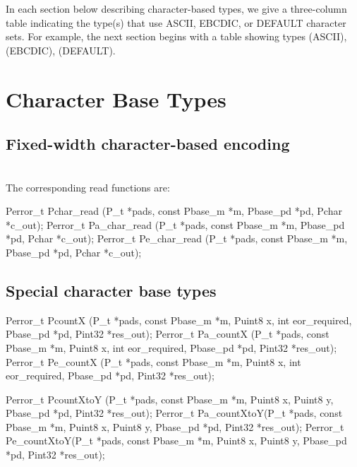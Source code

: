 In each section below describing character-based types, we give a
three-column table indicating the type(s) that use ASCII, EBCDIC, or
DEFAULT character sets.  For example, the next section begins with a
table showing types  (ASCII),  (EBCDIC), 
(DEFAULT).

\section{Character Base Types}

\subsection{Fixed-width character-based encoding}

\aedBegin{}
\aedEnd{}
\\[1ex]
The corresponding read functions are:
\begin{tinycodeaux}{\leftmargin=0in}
Perror_t Pchar_read   (P_t *pads, const Pbase_m *m, Pbase_pd *pd, Pchar *c_out);
Perror_t Pa_char_read (P_t *pads, const Pbase_m *m, Pbase_pd *pd, Pchar *c_out);
Perror_t Pe_char_read (P_t *pads, const Pbase_m *m, Pbase_pd *pd, Pchar *c_out);
\end{tinycodeaux}

\subsection{Special character base types}

\aedBegin{}
\aedEnd{}

\begin{tinycodeaux}{\leftmargin=0in}
Perror_t PcountX     (P_t *pads, const Pbase_m *m, Puint8 x, int eor_required,
		      Pbase_pd *pd, Pint32 *res_out);
Perror_t Pa_countX   (P_t *pads, const Pbase_m *m, Puint8 x, int eor_required,
		      Pbase_pd *pd, Pint32 *res_out);
Perror_t Pe_countX   (P_t *pads, const Pbase_m *m, Puint8 x, int eor_required,
		      Pbase_pd *pd, Pint32 *res_out);

Perror_t PcountXtoY  (P_t *pads, const Pbase_m *m, Puint8 x, Puint8 y,
		      Pbase_pd *pd, Pint32 *res_out);
Perror_t Pa_countXtoY(P_t *pads, const Pbase_m *m, Puint8 x, Puint8 y,
		      Pbase_pd *pd, Pint32 *res_out);
Perror_t Pe_countXtoY(P_t *pads, const Pbase_m *m, Puint8 x, Puint8 y,
		      Pbase_pd *pd, Pint32 *res_out);
\end{tinycodeaux}

